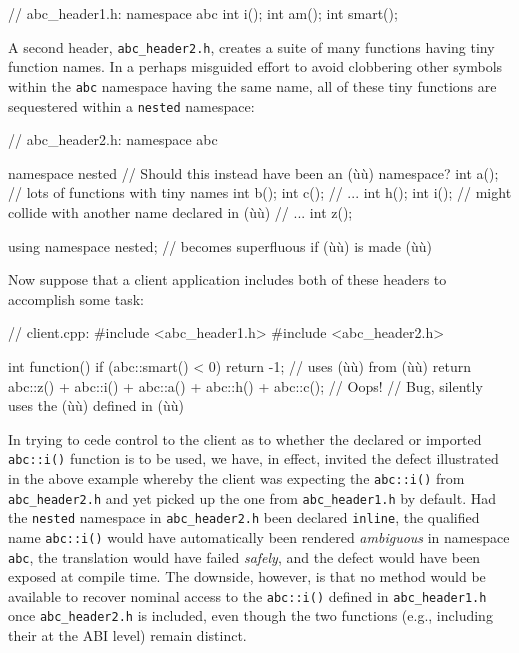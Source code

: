 \begin{emcppslisting}[emcppsbatch=e6]
// abc_header1.h:
namespace abc
{
    int i();
    int am();
    int smart();
}
\end{emcppslisting}
    
\noindent A second header, \lstinline!abc_header2.h!, creates a suite of many
functions having tiny function names. In a perhaps misguided effort to
avoid clobbering other symbols within the \lstinline!abc! namespace having
the same name, all of these tiny functions are sequestered within a
\lstinline!nested! namespace:

\begin{emcppslisting}[emcppsbatch=e6]
// abc_header2.h:
namespace abc
{
    namespace nested  // Should this instead have been an (ù{}ù) namespace?
    {
        int a();  // lots of functions with tiny names
        int b();
        int c();
        // ...
        int h();
        int i();  // might collide with another name declared in (ù{}ù)
        // ...
        int z();
    }

    using namespace nested;  // becomes superfluous if (ù{}ù) is made (ù{}ù)
}
\end{emcppslisting}
    
\noindent Now suppose that a client application includes
both of these headers to accomplish some task:

\begin{emcppslisting}[emcppsbatch=e6]
// client.cpp:
#include <abc_header1.h>
#include <abc_header2.h>

int function()
{
    if (abc::smart() < 0) { return -1; }  // uses (ù{}ù) from (ù{}ù)
    return abc::z() + abc::i() + abc::a() + abc::h() + abc::c();  // Oops!
        // Bug, silently uses the (ù{}ù) defined in (ù{}ù)
}
\end{emcppslisting}
    
\noindent In trying to cede control to the client as to whether the declared or
imported \lstinline!abc::i()! function is to be used, we have, in effect,
invited the defect illustrated in the above example whereby the client
was expecting the \lstinline!abc::i()! from \lstinline!abc_header2.h! and yet
picked up the one from \lstinline!abc_header1.h! by default. Had the
\lstinline!nested! namespace in \lstinline!abc_header2.h! been declared
\lstinline!inline!, the qualified name \lstinline!abc::i()! would have
automatically been rendered \emph{ambiguous} in namespace \lstinline!abc!,
the translation would have failed \emph{safely}, and the defect would
have been exposed at compile time. The downside, however, is that no
method would be available to recover nominal access to the
\lstinline!abc::i()! defined in \lstinline!abc_header1.h! once
\lstinline!abc_header2.h! is included, even though the two functions
(e.g., including their  at the ABI level) remain
distinct.

